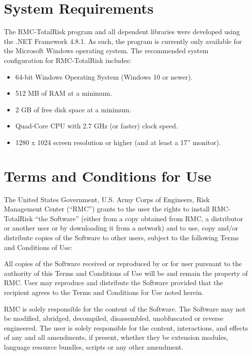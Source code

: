 \documentclass[
]{book}
\begin{document}
\hypertarget{system-requirements}{%
\section{System Requirements}\label{system-requirements}}

The RMC-TotalRisk program and all dependent libraries were developed using the .NET Framework 4.8.1. As such, the program is currently only available for the Microsoft Windows operating system. The recommended system configuration for RMC-TotalRisk includes:

\begin{itemize}
\item
  64-bit Windows Operating System (Windows 10 or newer).
\item
  512 MB of RAM at a minimum.
\item
  2 GB of free disk space at a minimum.
\item
  Quad-Core CPU with 2.7 GHz (or faster) clock speed.
\item
  1280 x 1024 screen resolution or higher (and at least a 17'' monitor).
\end{itemize}

\hypertarget{terms-and-conditions-for-use}{%
\section{Terms and Conditions for Use}\label{terms-and-conditions-for-use}}

The United States Government, U.S. Army Corps of Engineers, Risk Management Center (``RMC'') grants to the user the rights to install RMC-TotalRisk ``the Software'' (either from a copy obtained from RMC, a distributor or another user or by downloading it from a network) and to use, copy and/or distribute copies of the Software to other users, subject to the following Terms and Conditions of Use:

All copies of the Software received or reproduced by or for user pursuant to the authority of this Terms and Conditions of Use will be and remain the property of RMC. User may reproduce and distribute the Software provided that the recipient agrees to the Terms and Conditions for Use noted herein.

RMC is solely responsible for the content of the Software. The Software may not be modified, abridged, decompiled, disassembled, unobfuscated or reverse engineered. The user is solely responsible for the content, interactions, and effects of any and all amendments, if present, whether they be extension modules, language resource bundles, scripts or any other amendment.
\end{document}

